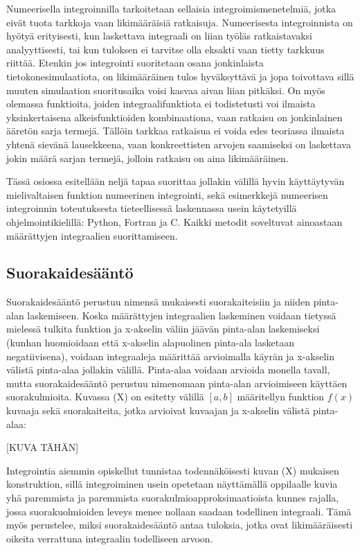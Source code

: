 \documentclass[../integrointiopas.tex]{subfiles}
\begin{document}
    
    Numeerisella integroinnilla tarkoitetaan sellaisia integroimismenetelmiä, jotka eivät tuota tarkkoja vaan likimääräisiä ratkaisuja.
    Numeerisesta integroinnista on hyötyä erityisesti, kun laskettava integraali on liian työläs ratkaistavaksi analyyttisesti, tai kun
    tuloksen ei tarvitse olla eksakti vaan tietty tarkkuus riittää. Etenkin jos integrointi suoritetaan osana jonkinlaista tietokonesimulaatiota,
    on likimääräinen tulos hyväksyttävä ja jopa toivottava sillä muuten simulaation suoritusaika voisi kasvaa aivan liian pitkäksi. On myös olemassa
    funktioita, joiden integraalifunktiota ei todistetusti voi ilmaista yksinkertaisena alkeisfunktioiden kombinaationa, vaan ratkaisu on jonkinlainen
    ääretön sarja termejä. Tällöin tarkkaa ratkaisua ei voida edes teoriassa ilmaista yhtenä sievänä lausekkeena, vaan konkreettisten arvojen saamiseksi
    on laskettava jokin määrä sarjan termejä, jolloin ratkaisu on aina likimääräinen.

    Tässä osiossa esitellään neljä tapaa suorittaa jollakin välillä hyvin käyttäytyvän mielivaltaisen funktion numeerinen integrointi, sekä esimerkkejä
    numeerisen integroinnin toteutuksesta tieteellisessä laskennassa usein käytetyillä ohjelmointikielillä: Python, Fortran ja C. Kaikki metodit soveltuvat
    ainoastaan määrättyjen integraalien suorittamiseen.

	\subsection{Suorakaidesääntö}

    Suorakaidesääntö perustuu nimensä mukaisesti suorakaiteisiin ja niiden pinta-alan laskemiseen. Koska määrättyjen integraalien laskeminen voidaan tietyssä
    mielessä tulkita funktion ja x-akselin väliin jäävän pinta-alan laskemiseksi (kunhan huomioidaan että x-akselin alapuolinen pinta-ala lasketaan negatiivisena),
    voidaan integraaleja määrittää arvioimalla käyrän ja x-akselin välistä pinta-alaa jollakin välillä. Pinta-alaa voidaan arvioida monella tavall, mutta suorakaidesääntö
    perustuu nimenomaan pinta-alan arvioimiseen käyttäen suorakulmioita. Kuvassa (X) on esitetty välillä $[a,b]$ määritellyn funktion $f(x)$ kuvaaja sekä suorakaiteita, jotka
    arvioivat kuvaajan ja x-akselin välistä pinta-alaa:

    [KUVA TÄHÄN]

    Integrointia aiemmin opiskellut tunnistaa todennäköisesti kuvan (X) mukaisen konstruktion, sillä integroiminen usein opetetaan näyttämällä oppilaalle kuvia
    yhä paremmista ja paremmista suorakulmioapproksimaatioista kunnes rajalla, jossa suorakuolmioiden leveys menee nollaan saadaan todellinen integraali. Tämä myös
    perustelee, miksi suorakaidesääntö antaa tuloksia, jotka ovat likimääräisesti oikeita verrattuna integraalin todelliseen arvoon.
\end{document}
